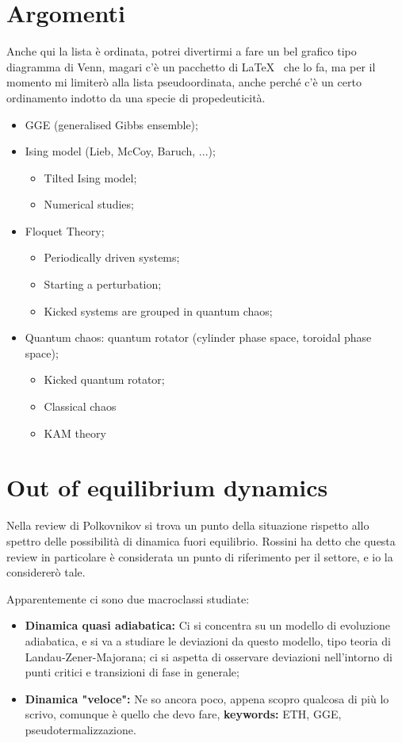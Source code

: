 \documentclass[a4paper,10pt]{article}
\begin{document}
\section{Argomenti}

Anche qui la lista è ordinata, potrei divertirmi a fare un bel grafico tipo diagramma di Venn, magari c'è un pacchetto di \LaTeX~ che lo fa, ma per il momento mi limiterò alla lista pseudoordinata, anche perché c'è un certo ordinamento indotto da una specie di propedeuticità.

\begin{itemize}
	\item GGE (generalised Gibbs ensemble);
	\item Ising model (Lieb, McCoy, Baruch, ...);
	\begin{itemize}
		\item Tilted Ising model;
		\item Numerical studies;
	\end{itemize}
	\item Floquet Theory;
	\begin{itemize}
		\item Periodically driven systems;
		\item Starting a perturbation;
		\item Kicked systems are grouped in quantum chaos;
	\end{itemize}
	\item Quantum chaos: quantum rotator (cylinder phase space, toroidal phase space);
	\begin{itemize}
		\item Kicked quantum rotator;
		\item Classical chaos
		\item KAM theory
	\end{itemize}
\end{itemize}

\section{Out of equilibrium dynamics}
Nella review di Polkovnikov si trova un punto della situazione rispetto allo spettro delle possibilità di dinamica fuori equilibrio. Rossini ha detto che questa review in particolare è considerata un punto di riferimento per il settore, e io la considererò tale.

Apparentemente ci sono due macroclassi studiate:
\begin{itemize}
	\item \textbf{Dinamica quasi adiabatica:} Ci si concentra su un  modello di evoluzione adiabatica, e si va a studiare le deviazioni da questo modello, tipo teoria di Landau-Zener-Majorana; ci si aspetta di osservare deviazioni nell'intorno di punti critici e transizioni di fase in generale;
	\item \textbf{Dinamica "veloce":} Ne so ancora poco, appena scopro qualcosa di più lo scrivo, comunque è quello che devo fare, \textbf{keywords:} ETH, GGE, pseudotermalizzazione.	
\end{itemize}
\end{document}
